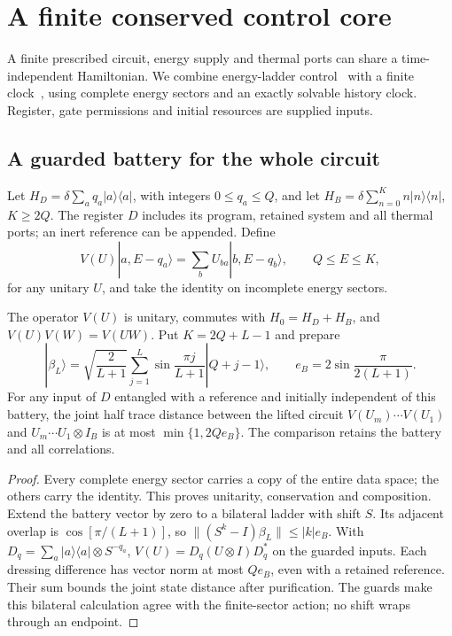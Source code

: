 \section{A finite conserved control core}
\label{sec:conserved-core}

A finite prescribed circuit, energy supply and thermal ports can share
a time-independent Hamiltonian. We combine energy-ladder
control~\cite{Aberg2014} with a finite clock~\cite{Woods2017},
using complete energy sectors and an exactly solvable history clock.
Register, gate permissions and initial resources are supplied inputs.

\subsection{A guarded battery for the whole circuit}

Let $H_D=\delta\sum_a q_a|a\rangle\langle a|$, with integers
$0\le q_a\le Q$, and let
$H_B=\delta\sum_{n=0}^K n|n\rangle\langle n|$, $K\ge2Q$.
The register $D$ includes its program, retained system and all thermal ports;
an inert reference can be appended. Define
\begin{equation}\label{eq:finite-lift}
 V(U)|a,E-q_a\rangle
   =\sum_b U_{ba}|b,E-q_b\rangle,\qquad Q\le E\le K,
\end{equation}
for any unitary $U$, and take the identity on incomplete energy sectors.

\begin{proposition}
\label{prop:finite-lift}
The operator $V(U)$ is unitary, commutes with $H_0=H_D+H_B$, and
$V(U)V(W)=V(UW)$. Put $K=2Q+L-1$ and prepare
\[
 |\beta_L\rangle=\sqrt{\frac2{L+1}}
 \sum_{j=1}^L\sin\frac{\pi j}{L+1}|Q+j-1\rangle,
 \qquad e_B=2\sin\frac{\pi}{2(L+1)}.
\]
For any input of $D$ entangled with a reference and initially independent of
this battery, the joint half trace distance between the lifted circuit
$V(U_m)\cdots V(U_1)$ and $U_m\cdots U_1\otimes I_B$ is at most
$\min\{1,2Qe_B\}$. The comparison retains the battery and all correlations.
\end{proposition}
\begin{proof}
Every complete energy sector carries a copy of the entire data space;
the others carry the identity. This proves unitarity, conservation and composition.
Extend the battery vector by zero to a bilateral ladder with shift $S$.
Its adjacent overlap is $\cos[\pi/(L+1)]$, so
$\|(S^k-I)\beta_L\|\le |k|e_B$.
With $D_q=\sum_a|a\rangle\langle a|\otimes S^{-q_a}$,
$V(U)=D_q(U\otimes I)D_q^*$ on the guarded inputs.
Each dressing difference has vector norm at most $Qe_B$, even with a retained
reference. Their sum bounds the joint state distance after purification.
The guards make this bilateral calculation agree with the finite-sector
action; no shift wraps through an endpoint.
\end{proof}


